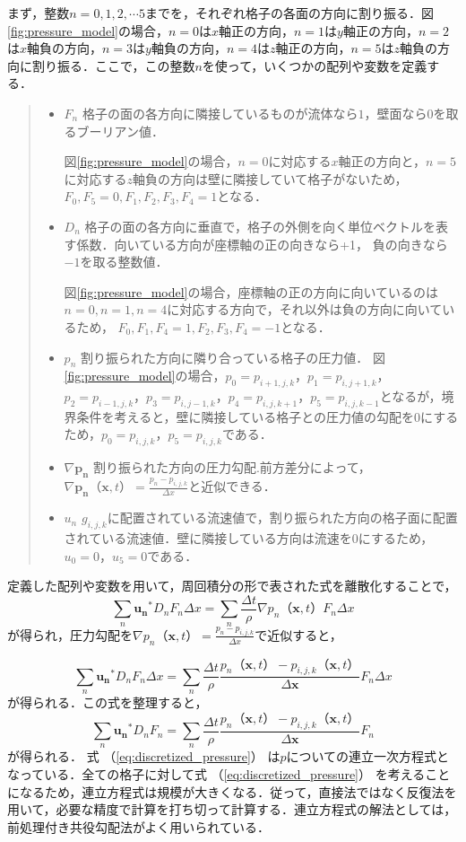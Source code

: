 \documentclass[a4j,12pt]{jreport}
\begin{document}
まず，整数$n=0,1,2,\cdots 5$までを，それぞれ格子の各面の方向に割り振る．図\ref{fig:pressure_model}の場合，$n=0$は$x$軸正の方向，$n=1$は$y$軸正の方向，$n=2$は$x$軸負の方向，$n=3$は$y$軸負の方向，$n=4$は$z$軸正の方向，$n=5$は$z$軸負の方向に割り振る．ここで，この整数$n$を使って，いくつかの配列や変数を定義する．
\begin{quote}
	\begin{itemize}
		\item $F_n$ 格子の面の各方向に隣接しているものが流体なら$1$，壁面なら$0$を取るブーリアン値．
		
		図\ref{fig:pressure_model}の場合，$n=0$に対応する$x$軸正の方向と，$n=5$に対応する$z$軸負の方向は壁に隣接していて格子がないため，$F_0,F_5 = 0,F_1,F_2,F_3,F_4 = 1$となる．
		\item $D_n$ 格子の面の各方向に垂直で，格子の外側を向く単位ベクトルを表す係数．向いている方向が座標軸の正の向きなら+1，					負の向きなら$-1$を取る整数値．
		
		図\ref{fig:pressure_model}の場合，座標軸の正の方向に向いているのは$n=0,n=1,n=4$に対応する方向で，それ以外は負の方向に向いているため，
		$F_0,F_1,F_4 = 1,F_2,F_3,F_4 = -1$となる．
		\item $p_n$ 割り振られた方向に隣り合っている格子の圧力値．
		図\ref{fig:pressure_model}の場合，$p_0 = p_{i+1,j,k}$，$p_1 = p_{i,j+1,k}$，$p_2 = p_{i-1,j,k}$，$p_3 = p_{i,j-1,k}$，$p_4 = p_{i,j,k+1}$，$p_5 = p_{i,j,k-1}$となるが，境界条件を考えると，壁に隣接している格子との圧力値の勾配を$0$にするため，$p_0 = p_{i,j,k}$，$p_5 = p_{i,j,k}$である．
		\item $\nabla\bm{p_n}$ 割り振られた方向の圧力勾配.前方差分によって，$\nabla \bm{p_n} （\bm{x},t）  = \frac{p_n - p_{i,j,k}}{\varDelta x}$と近似できる．
		\item $u_n$ $g_{i,j,k}$に配置されている流速値で，割り振られた方向の格子面に配置されている流速値．壁に隣接している方向は流速を$0$にするため，$u_0 = 0$，$u_5 = 0$である．
	\end{itemize}
\end{quote}

定義した配列や変数を用いて，周回積分の形で表された式を離散化することで，
$$ \sum_{n}\bm{u_n}^*D_nF_n\varDelta x = \sum_{n}\frac{\varDelta t}{\rho}\nabla p_n （\bm{x},t） F_n\varDelta x $$
が得られ，圧力勾配を$\nabla p_n （\bm{x},t）  = \frac{p_n - p_{i,j,k}}{\varDelta x}$で近似すると，

$$ \sum_{n}\bm{u_n}^*D_nF_n\varDelta x = \sum_{n}\frac{\varDelta t}{\rho}\frac{p_n （\bm{x},t） - p_{i,j,k} （\bm{x},t） }{\varDelta \bm{x}}F_n\varDelta x $$
が得られる．この式を整理すると，
\begin{equation}\label{eq:discretized_pressure}
\sum_{n}\bm{u_n}^*D_nF_n= \sum_{n}\frac{\varDelta t}{\rho}\frac{p_n （\bm{x},t）  - p_{i,j,k} （\bm{x},t） }{\varDelta \bm{x}}F_n
\end{equation} 
が得られる．
式 （\ref{eq:discretized_pressure}） は$p$についての連立一次方程式となっている．全ての格子に対して式 （\ref{eq:discretized_pressure}） を考えることになるため，連立方程式は規模が大きくなる．従って，直接法ではなく反復法を用いて，必要な精度で計算を打ち切って計算する．連立方程式の解法としては，前処理付き共役勾配法がよく用いられている．
\end{document}
